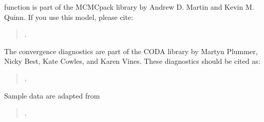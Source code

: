 function is part of the MCMCpack library by Andrew D.
Martin and Kevin M. Quinn. If you use this model, please cite:
\begin{verse}
.
\end{verse}
The convergence diagnostics are part of the CODA library
by Martyn Plummer, Nicky Best, Kate Cowles, and Karen Vines. These diagnostics
should be cited as: 
\begin{verse}
.
\end{verse}
\noindent Sample data are adapted from 
\begin{verse}
.
\end{verse}
